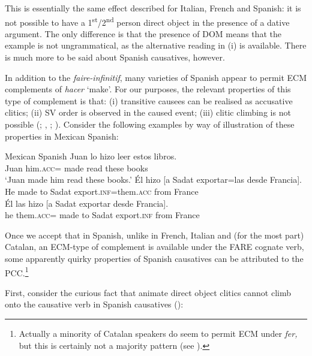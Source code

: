 \documentclass[output=paper,colorlinks,citecolor=brown,nonflat]{langsci/langscibook}
\begin{document}
This is essentially the same effect described for Italian, French and Spanish: it is not possible to have a 1\textsuperscript{st}/2\textsuperscript{nd} person direct object in the presence of a dative argument. The only difference is that the presence of DOM means that the example is not ungrammatical, as the alternative reading in (i) is available. There is much more to be said about Spanish causatives, however.

In addition to the \textit{faire-infinitif}, many varieties of Spanish appear to permit ECM complements of \textit{hacer} ‘make’. For our purposes, the relevant properties of this type of complement is that: (i) transitive causees can be realised as accusative clitics; (ii) SV order is observed in the caused event; (iii) clitic climbing is not possible (\citealt{Strozer1976}; \citealt{Treviño1992}, \citeyear{Treviño1993}; \citealt{Torrego2010, TubinoBlanco2011}). Consider the following examples by way of illustration of these properties in Mexican Spanish:
\newpage

\ea%
    \label{ex:sheehan:32}
    Mexican Spanish \citep[311, 169]{Treviño1992}
    \ea\label{ex:sheehan:32a}
    \gll    Juan lo     hizo   leer   estos libros.\\
            Juan him\textsc{.acc}=  made   read   these books\\
    \glt    ‘Juan made him read these books.’
    \ex\label{ex:sheehan:32b}
    \gll    Él  hizo  [a   Sadat  exportar=las      desde   Francia].\\
            He  made    {\db}to   Sadat  export.\textsc{inf}=them.\textsc{acc}   from   France\\
    \ex\label{ex:sheehan:32c}
    \gll    *Él  las  hizo [a   Sadat   exportar   desde   Francia].\\
            he them.\textsc{acc}=   made   {\db}to Sadat   export.\textsc{inf} from   France\\
    \z
\z

Once we accept that in Spanish, unlike in French, Italian and (for the most part) Catalan, an ECM-type of complement is available under the FARE cognate verb, some apparently quirky properties of Spanish causatives can be attributed to the PCC.\footnote{Actually a minority of Catalan speakers do seem to permit ECM under \textit{fer,} but this is certainly not a majority pattern (see \citealt{PinedaSchifanoSheehan2018}).}

First, consider the curious fact that animate direct object clitics cannot climb onto the causative verb in Spanish causatives (\citealt{Rivas1977, Bordelois1988, Torrego2010}):
\end{document}
